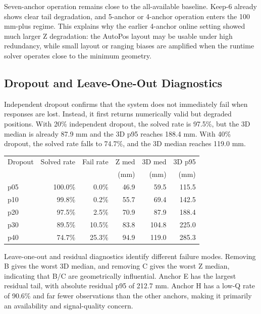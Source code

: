\documentclass[11pt]{article}
\begin{document}
Seven-anchor operation remains close to the all-available baseline. Keep-6 already shows clear tail degradation, and 5-anchor or 4-anchor operation enters the 100 mm-plus regime. This explains why the earlier 4-anchor online setting showed much larger Z degradation: the AutoPos layout may be usable under high redundancy, while small layout or ranging biases are amplified when the runtime solver operates close to the minimum geometry.

\subsection*{Dropout and Leave-One-Out Diagnostics}

Independent dropout confirms that the system does not immediately fail when responses are lost. Instead, it first returns numerically valid but degraded positions. With 20\% independent dropout, the solved rate is 97.5\%, but the 3D median is already 87.9 mm and the 3D p95 reaches 188.4 mm. With 40\% dropout, the solved rate falls to 74.7\%, and the 3D median reaches 119.0 mm.

\begin{center}
\small
\begin{tabular}{l r r r r r}
\toprule
Dropout & Solved rate & Fail rate & Z med & 3D med & 3D p95 \\
 & & & (mm) & (mm) & (mm) \\
\midrule
p05 & 100.0\% & 0.0\% & 46.9 & 59.5 & 115.5 \\
p10 & 99.8\% & 0.2\% & 55.7 & 69.4 & 142.5 \\
p20 & 97.5\% & 2.5\% & 70.9 & 87.9 & 188.4 \\
p30 & 89.5\% & 10.5\% & 83.8 & 104.8 & 225.0 \\
p40 & 74.7\% & 25.3\% & 94.9 & 119.0 & 285.3 \\
\bottomrule
\end{tabular}
\end{center}

Leave-one-out and residual diagnostics identify different failure modes. Removing B gives the worst 3D median, and removing C gives the worst Z median, indicating that B/C are geometrically influential. Anchor E has the largest residual tail, with absolute residual p95 of 212.7 mm. Anchor H has a low-Q rate of 90.6\% and far fewer observations than the other anchors, making it primarily an availability and signal-quality concern.
\end{document}
